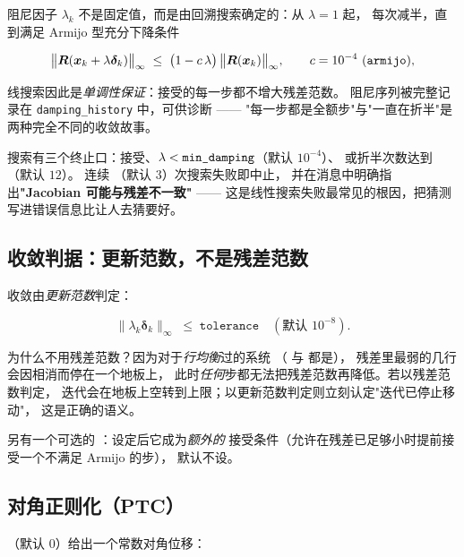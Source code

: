 阻尼因子 $\lambda_k$ 不是固定值，而是由回溯搜索确定的：从 $\lambda=1$ 起，
每次减半，直到满足 Armijo 型充分下降条件

\begin{equation}
\bigl\lVert\mat{R}(\bm{x}_k+\lambda\bm{\delta}_k)\bigr\rVert_\infty
\;\le\;
\bigl(1 - c\,\lambda\bigr)\,
\bigl\lVert\mat{R}(\bm{x}_k)\bigr\rVert_\infty ,
\qquad c = 10^{-4}\ (\akey{armijo}),
\label{eq:newton-armijo}
\end{equation}

线搜索因此是\emph{单调性保证}：接受的每一步都不增大残差范数。
阻尼序列被完整记录在 \texttt{damping\_history} 中，可供诊断 ——
"每一步都是全额步"与"一直在折半"是两种完全不同的收敛故事。

搜索有三个终止口：接受、$\lambda < \akey{min_damping}$（默认 $10^{-4}$）、
或折半次数达到 （默认 $12$）。
连续 （默认 $3$）次搜索失败即中止，
并在消息中明确指出\textbf{"Jacobian 可能与残差不一致"} ——
这是线性搜索失败最常见的根因，把猜测写进错误信息比让人去猜要好。

\subsection{收敛判据：更新范数，不是残差范数}
\label{sec:newton-convergence}

收敛由\emph{更新范数}判定：

\begin{equation}
\bigl\lVert\lambda_k\bm{\delta}_k\bigr\rVert_\infty \;\le\; \texttt{tolerance}
\quad(\text{默认 } 10^{-8}).
\label{eq:newton-convergence}
\end{equation}

为什么不用残差范数？因为对于\emph{行均衡}过的系统
（ 与  都是），
残差里最弱的几行会因相消而停在一个地板上，
此时\emph{任何}步都无法把残差范数再降低。若以残差范数判定，
迭代会在地板上空转到上限；以更新范数判定则立刻认定"迭代已停止移动"，
这是正确的语义。

另有一个可选的 ：设定后它成为\emph{额外的}
接受条件（允许在残差已足够小时提前接受一个不满足 Armijo 的步），
默认不设。

\subsection{对角正则化（PTC）}
\label{sec:newton-ptc}

（默认 $0$）给出一个常数对角位移：

